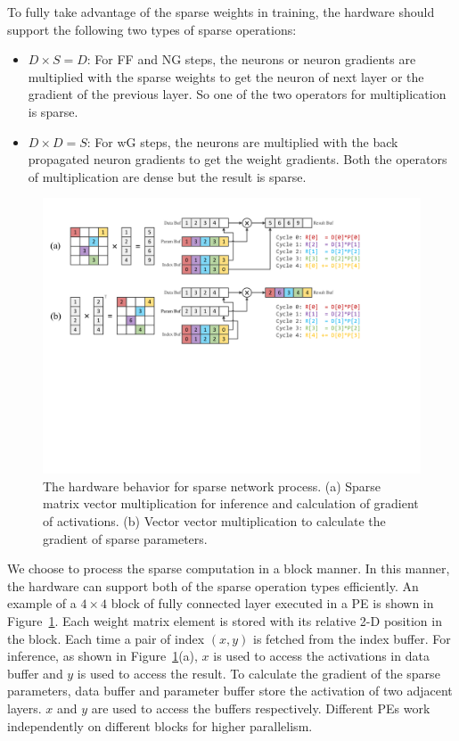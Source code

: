 To fully take advantage of the sparse weights in training, the hardware should support the following two types of sparse operations:
\begin{itemize}
\item $D\times S=D$: For FF and NG steps, the neurons or neuron gradients are multiplied with the sparse weights to get the neuron of next layer or the gradient of the previous layer. So one of the two operators for multiplication is sparse.
\item $D\times D=S$: For wG steps, the neurons are multiplied with the back propagated neuron gradients to get the weight gradients. Both the operators of multiplication are dense but the result is sparse.
\end{itemize}

\begin{figure}[t] 
  \centering
  \includegraphics[width=1.8\columnwidth]{figures/sparse_mv.pdf}
  \caption{The hardware behavior for sparse network process. (a) Sparse matrix vector multiplication for inference and calculation of gradient of activations. (b) Vector vector multiplication to calculate the gradient of sparse parameters. }
  \label{fig:spmv}
\end{figure}


We choose to process the sparse computation in a block manner. In this manner, the hardware can support both of the sparse operation types efficiently. An example of a $4\times 4$ block of fully connected layer executed in a PE is shown in Figure~\ref{fig:spmv}. Each weight matrix element is stored with its relative 2-D position in the block. Each time a pair of index $(x, y)$ is fetched from the index buffer. For inference, as shown in Figure~\ref{fig:spmv}(a), $x$ is used to access the activations in data buffer and $y$ is used to access the result. To calculate the gradient of the sparse parameters, data buffer and parameter buffer store the activation of two adjacent layers. $x$ and $y$ are used to access the buffers respectively. Different PEs work independently on different blocks for higher parallelism.

